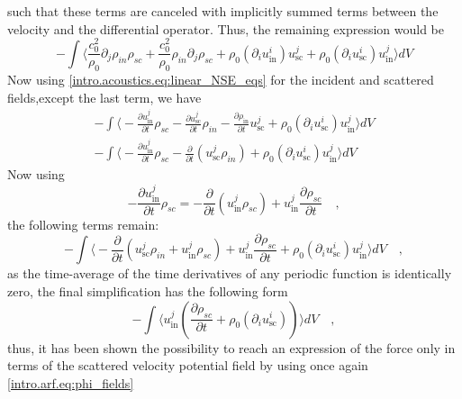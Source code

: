 such that these terms are canceled with implicitly summed terms between the velocity and the differential operator. Thus, the remaining expression would be
\begin{equation}\label{intro.arf.eq:force_in_sc_gauss}
    -\int\bigg\langle\frac{c_0^2}{\rho_0}\partial_j\rho_{in}\rho_{sc} + \frac{c_0^2}{\rho_0}\rho_{in}\partial_j\rho_{sc} + \rho_0(\partial_{i}u_{\text{in}}^{i})u_{\text{sc}}^{j} + \rho_0(\partial_{i}u_{\text{sc}}^{i})u_{\text{in}}^{j}\bigg\rangle dV
\end{equation}
Now using \eqref{intro.acoustics.eq:linear_NSE_eqs} for the incident and scattered fields,except the last term, we have
\begin{align}\label{intro.arf.eq:force_in_sc_gauss}
    -\int\bigg\langle-\frac{\partial u_{\text{in}}^{j}}{\partial t}\rho_{sc} - \frac{\partial u_{\text{sc}}^{j}}{\partial t}\rho_{in} -\frac{\partial\rho_{\text{in}}}{\partial t}u_{\text{sc}}^{j} + \rho_0(\partial_{i}u_{\text{sc}}^{i})u_{\text{in}}^{j}\bigg\rangle dV \nonumber\\
    -\int\bigg\langle-\frac{\partial u_{\text{in}}^{j}}{\partial t}\rho_{sc} - \frac{\partial}{\partial t}(u_{\text{sc}}^{j}\rho_{in}) + \rho_0(\partial_{i}u_{\text{sc}}^{i})u_{\text{in}}^{j}\bigg\rangle dV 
\end{align}
Now using 
\begin{equation}
    -\frac{\partial u_{\text{in}}^{j}}{\partial t}\rho_{sc} = -\frac{\partial}{\partial t}(u_{\text{in}}^{j}\rho_{sc}) + u_{\text{in}}^{j}\frac{\partial \rho_{sc}}{\partial t}\quad,
\end{equation}
the following terms remain:
\begin{equation}
    -\int\bigg\langle-\frac{\partial}{\partial t}(u_{\text{sc}}^{j}\rho_{in} + u_{\text{in}}^{j}\rho_{sc}) + u_{\text{in}}^{j}\frac{\partial \rho_{sc}}{\partial t} + \rho_0(\partial_{i}u_{\text{sc}}^{i})u_{\text{in}}^{j}\bigg\rangle dV\quad,
\end{equation}
as the time-average of the time derivatives of any periodic function is identically zero, the final simplification has the following form
\begin{equation}
    -\int\bigg\langle u_{\text{in}}^{j}\left(\frac{\partial \rho_{sc}}{\partial t} + \rho_0(\partial_{i}u_{\text{sc}}^{i})\right)\bigg\rangle dV\quad,
\end{equation}
thus, it has been shown the possibility to reach an expression of the force only in terms of the scattered velocity potential field by using once again \eqref{intro.arf.eq:phi_fields}
